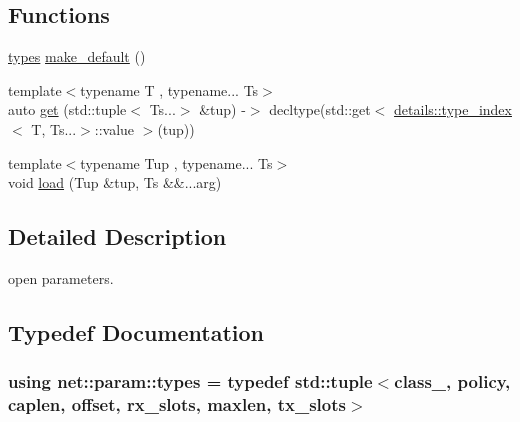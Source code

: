\subsection*{Functions}
\begin{DoxyCompactItemize}
\item 
\hyperlink{namespacenet_1_1param_a08dbec045b170d7c25411fee7a5cc1ce}{types} \hyperlink{namespacenet_1_1param_a03072e1c0a005826ed22d692d3f88074}{make\-\_\-default} ()
\item 
{\footnotesize template$<$typename T , typename... Ts$>$ }\\auto \hyperlink{namespacenet_1_1param_a9020a1d5f00da972acbea3e809d3c602}{get} (std\-::tuple$<$ Ts...$>$ \&tup) -\/$>$ decltype(std\-::get$<$ \hyperlink{structnet_1_1param_1_1details_1_1type__index}{details\-::type\-\_\-index}$<$ T, Ts...$>$\-::value $>$(tup))
\item 
{\footnotesize template$<$typename Tup , typename... Ts$>$ }\\void \hyperlink{namespacenet_1_1param_aef5f360e345f5ab876c171a76a0777a2}{load} (Tup \&tup, Ts \&\&...arg)
\end{DoxyCompactItemize}


\subsection{Detailed Description}
open parameters. 

\subsection{Typedef Documentation}
\hypertarget{namespacenet_1_1param_a08dbec045b170d7c25411fee7a5cc1ce}{
\subsubsection[{types}]{\setlength{\rightskip}{0pt plus 5cm}using {\bf net\-::param\-::types} = typedef std\-::tuple$<${\bf class\-\_\-}, {\bf policy}, {\bf caplen}, {\bf offset}, {\bf rx\-\_\-slots}, {\bf maxlen}, {\bf tx\-\_\-slots}$>$}}\label{namespacenet_1_1param_a08dbec045b170d7c25411fee7a5cc1ce}


